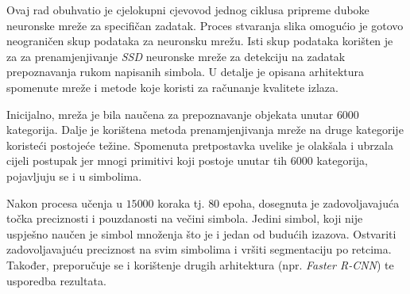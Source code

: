 Ovaj rad obuhvatio je cjelokupni cjevovod jednog ciklusa pripreme duboke neuronske mreže za specifičan zadatak.
Proces stvaranja slika omogućio je gotovo neograničen skup podataka za neuronsku mrežu.
Isti skup podataka korišten je za za prenamjenjivanje \emph{SSD} neuronske mreže za detekciju na zadatak prepoznavanja rukom napisanih simbola.
U detalje je opisana arhitektura spomenute mreže i metode koje koristi za računanje kvalitete izlaza.

Inicijalno, mreža je bila naučena za prepoznavanje objekata unutar $6000$ kategorija.
Dalje je korištena metoda prenamjenjivanja mreže na druge kategorije koristeći postojeće težine.
Spomenuta pretpostavka uvelike je olakšala i ubrzala cijeli postupak jer mnogi primitivi koji postoje unutar tih $6000$ kategorija, pojavljuju se i u simbolima.

Nakon procesa učenja u $15 000$ koraka tj. $80$ epoha, dosegnuta je zadovoljavajuća točka preciznosti i pouzdanosti na večini simbola.
Jedini simbol, koji nije uspješno naučen je simbol množenja što je i jedan od budućih izazova.
Ostvariti zadovoljavajuću preciznost na svim simbolima i vršiti segmentaciju po retcima.
Također, preporučuje se i korištenje drugih arhitektura (npr. \emph{Faster R-CNN}) te usporedba rezultata.
 
